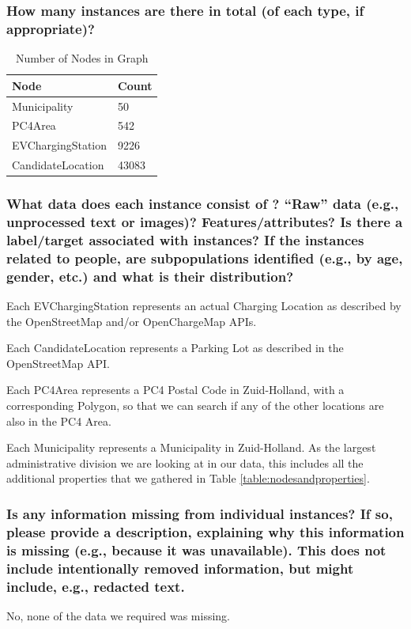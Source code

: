 \documentclass{article}
\newcommand{\question}[1]{#1}
\begin{document}
\question{\subsubsection*{How many instances are there in total (of each type, if appropriate)?}}
\begin{table}[H]
	\begin{tabularx}{\textwidth}{X|X}
		\textbf{Node}     & \textbf{Count} \\
		\hline
		Municipality      & 50             \\
		\hline
		PC4Area           & 542            \\
		\hline
		EVChargingStation & 9226           \\
		\hline
		CandidateLocation & 43083          \\
		\hline
	\end{tabularx}
	\caption{Number of Nodes in Graph}
\end{table}

\question{\subsubsection*{What data does each instance consist of ? “Raw” data (e.g., unprocessed text or images)? Features/attributes? Is there a label/target associated with
		instances? If the instances related to people, are subpopulations identified (e.g., by age, gender, etc.) and what is
		their distribution?}}
Each EVChargingStation represents an actual Charging Location as described by the OpenStreetMap and/or OpenChargeMap APIs.

Each CandidateLocation represents a Parking Lot as described in the OpenStreetMap API.

Each PC4Area represents a PC4 Postal Code in Zuid-Holland, with a corresponding Polygon, so that we can search if any of the other locations are also in the PC4 Area.

Each Municipality represents a Municipality in Zuid-Holland. As the largest administrative division we are looking at in our data, this includes all the additional properties that we gathered in Table \ref{table:nodesandproperties}.

\question{\subsubsection*{Is any information missing from individual instances? If so, please
		provide a description, explaining why this information is missing (e.g., because it was unavailable). This does not include intentionally removed information, but might include, e.g., redacted text.}}
No, none of the data we required was missing.
\end{document}
